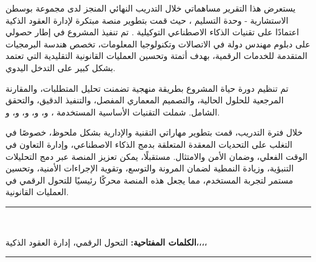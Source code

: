 \begin{RLtext}

يستعرض هذا التقرير مساهماتي خلال التدريب النهائي المنجز لدى مجموعة بوسطن الاستشارية - وحدة التسليم ، حيث قمت بتطوير منصة مبتكرة لإدارة العقود الذكية اعتمادًا على تقنيات الذكاء الاصطناعي التوكيلية . تم تنفيذ المشروع في إطار حصولي على دبلوم مهندس دولة في الاتصالات وتكنولوجيا المعلومات، تخصص هندسة البرمجيات المتقدمة للخدمات الرقمية، بهدف أتمتة وتحسين العمليات القانونية التقليدية التي تعتمد بشكل كبير على التدخل اليدوي.

تم تنظيم دورة حياة المشروع بطريقة منهجية تضمنت تحليل المتطلبات، والمقارنة المرجعية للحلول الحالية، والتصميم المعماري المفصل، والتنفيذ الدقيق، والتحقق الشامل. شملت التقنيات الأساسية المستخدمة ، و، و، و، و، و.

خلال فترة التدريب، قمت بتطوير مهاراتي التقنية والإدارية بشكل ملحوظ، خصوصًا في التغلب على التحديات المعقدة المتعلقة بدمج الذكاء الاصطناعي، وإدارة التعاون في الوقت الفعلي، وضمان الأمن والامتثال. مستقبلًا، يمكن تعزيز المنصة عبر دمج التحليلات التنبؤية، وزيادة النمطية لضمان المرونة والتوسع، وتقوية الإجراءات الأمنية، وتحسين مستمر لتجربة المستخدم، مما يجعل هذه المنصة محركًا رئيسيًا للتحول الرقمي في العمليات القانونية.

\bigskip
\end{RLtext}

\noindent\rule{\linewidth}{0.3mm} \\[0.05cm] 
\begin{RLtext}
    \textbf{الكلمات المفتاحية:} التحول الرقمي، إدارة العقود الذكية،،،،
\end{RLtext}

\noindent\rule{\linewidth}{0.3mm} \\[0.6cm]